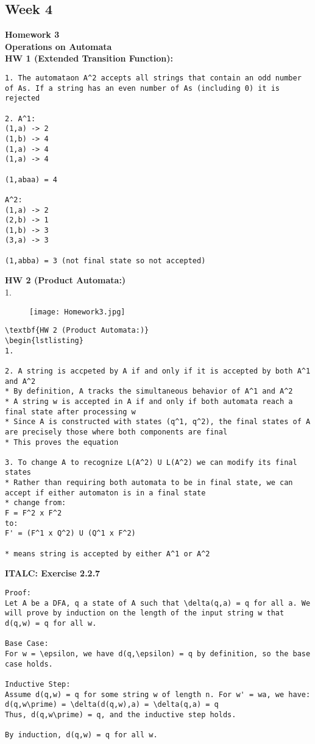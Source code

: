 \documentclass{article}
\theoremstyle{theorem}
\theoremstyle{definition}
\theoremstyle{remark}
\begin{document}
\subsection{Week 4}
\textbf{Homework 3} \\
\textbf{Operations on Automata} \\
\textbf{HW 1 (Extended Transition Function):} 
\begin{lstlisting}
1. The automataon A^2 accepts all strings that contain an odd number of As. If a string has an even number of As (including 0) it is rejected

2. A^1: 
(1,a) -> 2
(1,b) -> 4
(1,a) -> 4
(1,a) -> 4

(1,abaa) = 4

A^2: 
(1,a) -> 2
(2,b) -> 1
(1,b) -> 3
(3,a) -> 3

(1,abba) = 3 (not final state so not accepted)
\end{lstlisting}

\textbf{HW 2 (Product Automata:)}\\
1. \begin{figure}[h] %
    \centering
    \texttt{[image: Homework3.jpg]} %
    \caption{}
\end{figure}
\begin{lstlisting}
\textbf{HW 2 (Product Automata:)}
\begin{lstlisting}
1. 

2. A string is accpeted by A if and only if it is accepted by both A^1 and A^2
* By definition, A tracks the simultaneous behavior of A^1 and A^2
* A string w is accepted in A if and only if both automata reach a final state after processing w
* Since A is constructed with states (q^1, q^2), the final states of A are precisely those where both components are final
* This proves the equation

3. To change A to recognize L(A^2) U L(A^2) we can modify its final states
* Rather than requiring both automata to be in final state, we can accept if either automaton is in a final state
* change from:
F = F^2 x F^2
to:
F' = (F^1 x Q^2) U (Q^1 x F^2)

* means string is accepted by either A^1 or A^2
\end{lstlisting}

\textbf{ITALC: Exercise 2.2.7}
\begin{lstlisting}
Proof:
Let A be a DFA, q a state of A such that \delta(q,a) = q for all a. We will prove by induction on the length of the input string w that d(q,w) = q for all w.

Base Case: 
For w = \epsilon, we have d(q,\epsilon) = q by definition, so the base case holds.

Inductive Step:
Assume d(q,w) = q for some string w of length n. For w' = wa, we have:
d(q,w\prime) = \delta(d(q,w),a) = \delta(q,a) = q
Thus, d(q,w\prime) = q, and the inductive step holds.

By induction, d(q,w) = q for all w.
\end{lstlisting}
\end{document}
